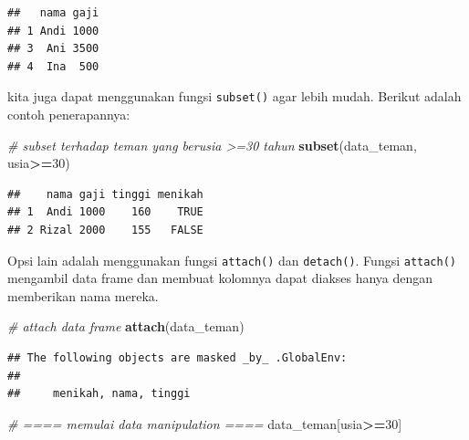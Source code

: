\documentclass[]{book}
\newenvironment{Shaded}{\begin{snugshade}}{\end{snugshade}}
\newcommand{\KeywordTok}[1]{\textcolor[rgb]{0.13,0.29,0.53}{\textbf{#1}}}
\newcommand{\DecValTok}[1]{\textcolor[rgb]{0.00,0.00,0.81}{#1}}
\newcommand{\CommentTok}[1]{\textcolor[rgb]{0.56,0.35,0.01}{\textit{#1}}}
\newcommand{\OtherTok}[1]{\textcolor[rgb]{0.56,0.35,0.01}{#1}}
\newcommand{\OperatorTok}[1]{\textcolor[rgb]{0.81,0.36,0.00}{\textbf{#1}}}
\newcommand{\NormalTok}[1]{#1}
\begin{document}
\begin{Shaded}
\end{Shaded}

\begin{verbatim}
##   nama gaji
## 1 Andi 1000
## 3  Ani 3500
## 4  Ina  500
\end{verbatim}

kita juga dapat menggunakan fungsi \texttt{subset()} agar lebih mudah.
Berikut adalah contoh penerapannya:

\begin{Shaded}
\begin{Highlighting}[]
\CommentTok{# subset terhadap teman yang berusia >=30 tahun}
\KeywordTok{subset}\NormalTok{(data_teman, usia}\OperatorTok{>=}\DecValTok{30}\NormalTok{)}
\end{Highlighting}
\end{Shaded}

\begin{verbatim}
##    nama gaji tinggi menikah
## 1  Andi 1000    160    TRUE
## 2 Rizal 2000    155   FALSE
\end{verbatim}

Opsi lain adalah menggunakan fungsi \texttt{attach()} dan
\texttt{detach()}. Fungsi \texttt{attach()} mengambil data frame dan
membuat kolomnya dapat diakses hanya dengan memberikan nama mereka.

\begin{Shaded}
\begin{Highlighting}[]
\CommentTok{# attach data frame}
\KeywordTok{attach}\NormalTok{(data_teman)}
\end{Highlighting}
\end{Shaded}

\begin{verbatim}
## The following objects are masked _by_ .GlobalEnv:
## 
##     menikah, nama, tinggi
\end{verbatim}

\begin{Shaded}
\begin{Highlighting}[]
\CommentTok{# ==== memulai data manipulation ====}
\NormalTok{data_teman[usia}\OperatorTok{>=}\DecValTok{30}\NormalTok{]}
\end{Highlighting}
\end{Shaded}
\end{document}
